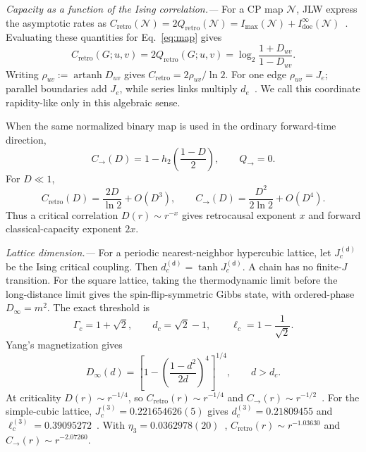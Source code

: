 \documentclass[aps,prl,reprint,amsmath,amssymb,superscriptaddress,nofootinbib,floatfix]{revtex4-2}
\newcommand{\Cretro}{C_{\mathrm{retro}}}
\newcommand{\Qretro}{Q_{\mathrm{retro}}}
\newcommand{\Cfwd}{C_{\rightarrow}}
\newcommand{\Qfwd}{Q_{\rightarrow}}
\newcommand{\Imax}{I_{\max}}
\newcommand{\Idoe}{I_{\mathrm{doe}}}
\begin{document}
\textit{Capacity as a function of the Ising correlation.---}
For a CP map $\mathcal N$, JLW express the asymptotic rates as $\Cretro(\mathcal N)=2\Qretro(\mathcal N)=\Imax(\mathcal N)+\Idoe^{\infty}(\mathcal N)$~\cite{Ji2026}. Evaluating these quantities for Eq.~\eqref{eq:map} gives
\begin{equation}
 \Cretro(G;u,v)=2\Qretro(G;u,v)=\log_2\frac{1+D_{uv}}{1-D_{uv}}.
\label{eq:capacity}
\end{equation}
Writing $\rho_{uv}:=\operatorname{artanh}D_{uv}$ gives $\Cretro=2\rho_{uv}/\ln2$. For one edge $\rho_{uv}=J_e$; parallel boundaries add $J_e$, while series links multiply $d_e$~\cite{SM}. We call this coordinate rapidity-like only in this algebraic sense.

When the same normalized binary map is used in the ordinary forward-time direction,
\begin{equation}
 \Cfwd(D)=1-h_2\!\left(\frac{1-D}{2}\right),\qquad \Qfwd=0.
\label{eq:forwardC}
\end{equation}
For $D\ll1$,
\begin{equation}
 \Cretro(D)=\frac{2D}{\ln2}+O(D^3),\qquad \Cfwd(D)=\frac{D^2}{2\ln2}+O(D^4).
\label{eq:weakD}
\end{equation}
Thus a critical correlation $D(r)\sim r^{-x}$ gives retrocausal exponent $x$ and forward classical-capacity exponent $2x$.

\textit{Lattice dimension.---}
For a periodic nearest-neighbor hypercubic lattice, let $J_c^{(\mathsf d)}$ be the Ising critical coupling. Then $d_c^{(\mathsf d)}=\tanh J_c^{(\mathsf d)}$. A chain has no finite-$J$ transition. For the square lattice, taking the thermodynamic limit before the long-distance limit gives the spin-flip-symmetric Gibbs state, with ordered-phase $D_\infty=m^2$. The exact threshold is
\begin{equation}
 \Gamma_c=1+\sqrt2,\qquad d_c=\sqrt2-1,\qquad \ell_c=1-\frac1{\sqrt2}.
\label{eq:critical}
\end{equation}
Yang's magnetization gives
\begin{equation}
 D_\infty(d)=\left[1-\left(\frac{1-d^2}{2d}\right)^4\right]^{1/4},\qquad d>d_c.
\label{eq:Dinf}
\end{equation}
At criticality $D(r)\sim r^{-1/4}$, so $\Cretro(r)\sim r^{-1/4}$ and $\Cfwd(r)\sim r^{-1/2}$~\cite{Montroll1963,Wu1976}. For the simple-cubic lattice, $J_c^{(3)}=0.221654626(5)$ gives $d_c^{(3)}=0.21809455$ and $\ell_c^{(3)}=0.39095272$~\cite{Ferrenberg2018}. With $\eta_3=0.0362978(20)$~\cite{Kos2016}, $\Cretro(r)\sim r^{-1.03630}$ and $\Cfwd(r)\sim r^{-2.07260}$.
\end{document}
